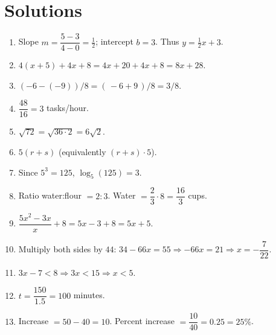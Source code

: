 \documentclass{article}
\begin{document}
\newpage
\section*{Solutions}

\begin{enumerate}[label=\textbf{\arabic*.}, leftmargin=*, itemsep=0.45em]

\item Slope \(m=\dfrac{5-3}{4-0}=\tfrac12\); intercept \(b=3\). Thus \(y=\tfrac12 x+3\).

\item \(4(x+5)+4x+8=4x+20+4x+8=8x+28\).

\item \((-6-(-9))/8=(\,-6+9\,)/8=3/8\).

\item \(\dfrac{48}{16}=3\) tasks/hour.

\item \(\sqrt{72}=\sqrt{36\cdot 2}=6\sqrt{2}\).

\item \(5(r+s)\) (equivalently \((r+s)\cdot 5\)).

\item Since \(5^{3}=125\), \(\log_{5}(125)=3\).

\item Ratio water:flour \(=2:3\). Water \(=\dfrac{2}{3}\cdot 8=\dfrac{16}{3}\) cups.

\item \(\dfrac{5x^{2}-3x}{x}+8=5x-3+8=5x+5\).

\item Multiply both sides by \(44\): \(34-66x=55\Rightarrow -66x=21\Rightarrow x=-\dfrac{7}{22}\).

\item \(3x-7<8\Rightarrow 3x<15\Rightarrow x<5\).

\item \(t=\dfrac{150}{1.5}=100\) minutes.

\item Increase \(=50-40=10\). Percent increase \(=\dfrac{10}{40}=0.25=25\%\).

\end{enumerate}
\end{document}
